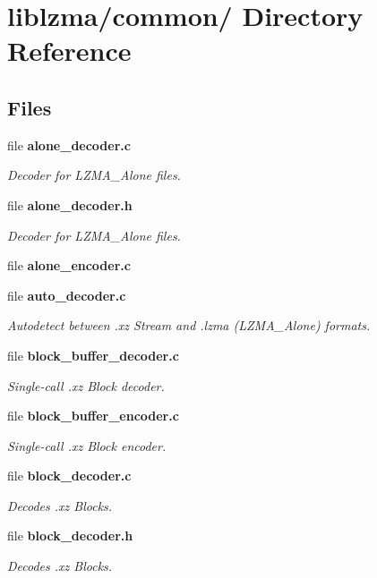 \section{liblzma/common/ Directory Reference}
\label{dir_db777975f8e21a5de5f283e04473bf67}
\subsection*{Files}
\begin{DoxyCompactItemize}
\item 
file {\bf alone\-\_\-decoder.\-c}
\begin{DoxyCompactList}\small\item\em Decoder for L\-Z\-M\-A\-\_\-\-Alone files. \end{DoxyCompactList}\item 
file {\bf alone\-\_\-decoder.\-h}
\begin{DoxyCompactList}\small\item\em Decoder for L\-Z\-M\-A\-\_\-\-Alone files. \end{DoxyCompactList}\item 
file {\bfseries alone\-\_\-encoder.\-c}
\item 
file {\bf auto\-\_\-decoder.\-c}
\begin{DoxyCompactList}\small\item\em Autodetect between .xz Stream and .lzma (L\-Z\-M\-A\-\_\-\-Alone) formats. \end{DoxyCompactList}\item 
file {\bf block\-\_\-buffer\-\_\-decoder.\-c}
\begin{DoxyCompactList}\small\item\em Single-\/call .xz Block decoder. \end{DoxyCompactList}\item 
file {\bf block\-\_\-buffer\-\_\-encoder.\-c}
\begin{DoxyCompactList}\small\item\em Single-\/call .xz Block encoder. \end{DoxyCompactList}\item 
file {\bf block\-\_\-decoder.\-c}
\begin{DoxyCompactList}\small\item\em Decodes .xz Blocks. \end{DoxyCompactList}\item 
file {\bf block\-\_\-decoder.\-h}
\begin{DoxyCompactList}\small\item\em Decodes .xz Blocks. \end{DoxyCompactList}\item 

\end{DoxyCompactItemize}
